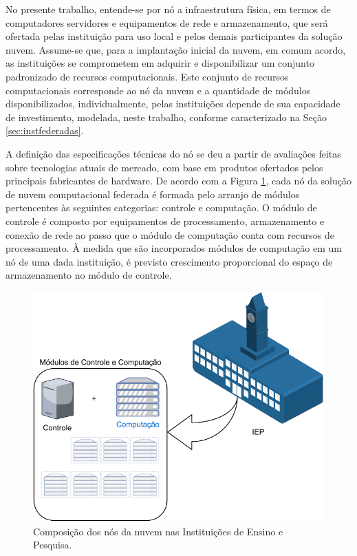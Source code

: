 \documentclass[tese,capa]{texufpel}
\begin{document}
No presente trabalho, entende-se por nó a infraestrutura física, em termos de computadores servidores e equipamentos de rede e armazenamento, que será ofertada pelas instituição para uso local e pelos demais participantes da solução nuvem. Assume-se que, para a implantação inicial da nuvem, em comum acordo, as instituições se comprometem em adquirir e disponibilizar um conjunto padronizado de recursos computacionais. Este conjunto de recursos computacionais corresponde ao nó da nuvem e a quantidade de módulos disponibilizados, individualmente, pelas instituições depende de sua capacidade de investimento, modelada, neste trabalho, conforme caracterizado na Seção \ref{sec:instfederadas}.

A definição das especificações técnicas do nó se deu a partir de avaliações feitas sobre tecnologias atuais de mercado, com base em produtos ofertados pelos principais fabricantes de hardware. De acordo com a Figura \ref{fig:IEPNosModulos}, cada nó da solução de nuvem computacional federada é formada pelo arranjo de módulos pertencentes às seguintes categorias: controle e computação. O módulo de controle é composto por equipamentos de processamento, armazenamento e conexão de rede ao passo que o módulo de computação conta com recursos de processamento. À medida que são incorporados módulos de computação em um nó de uma dada instituição, é previsto crescimento proporcional do espaço de armazenamento no módulo de controle.

\begin{figure}[H]
	\centering 
	\includegraphics[scale=1]{images/IEPNosModulos-v2.drawio.pdf}
	\caption[Composição dos nós da nuvem nas Instituições de Ensino e Pesquisa.]{Composição dos nós da nuvem nas Instituições de Ensino e Pesquisa.} 
	\label{fig:IEPNosModulos}
\end{figure}
\end{document}
